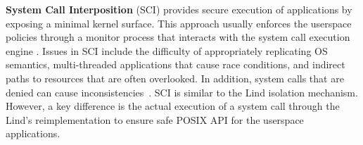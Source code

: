 \textbf{System Call Interposition} (SCI) provides
secure execution of applications by exposing a minimal kernel surface.
This approach usually enforces the userspace policies through a monitor process that
interacts with the system call execution engine
\cite{SCI-04}.
Issues in SCI include the difficulty of appropriately replicating OS semantics,
multi-threaded applications that cause race conditions, and indirect paths to resources that are often overlooked.
In addition, system calls that are denied can cause inconsistencies~\cite{Problems-SCI}.
%
%
%
%
%
SCI is similar to the Lind isolation mechanism. However, a key difference is the actual execution
of a system call through the Lind's reimplementation to ensure safe POSIX API for the userspace applications.

